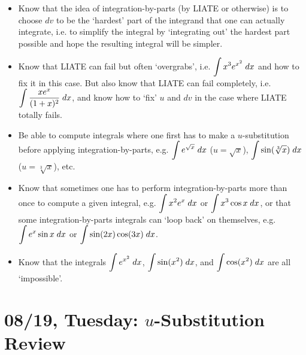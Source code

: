 \documentclass[11pt,letterpaper]{article}
\begin{document}
\begin{itemize}
\item Know that the idea of integration-by-parts (by LIATE or otherwise) is to choose $dv$ to be the `hardest' part of the integrand that one can actually integrate, i.e. to simplify the integral by `integrating out' the hardest part possible and hope the resulting integral will be simpler. 

\item Know that LIATE can fail but often `overgrabs', i.e. $\displaystyle\int x^3 e^{x^2} \;dx$ and how to fix it in this case. But also know that LIATE can fail completely, i.e. $\displaystyle\int \dfrac{x e^x}{(1 + x)^2} \;dx$, and know how to `fix' $u$ and $dv$ in the case where LIATE totally fails. 

\item Be able to compute integrals where one first has to make a $u$-substitution before applying integration-by-parts, e.g. $\displaystyle\int e^{\sqrt{x}} \;dx$ ($u= \sqrt{x}$), $\displaystyle\int \sin(\sqrt[3]{x}) \;dx$ ($u= \sqrt[3]{x}$), etc.

\item Know that sometimes one has to perform integration-by-parts more than once to compute a given integral, e.g. $\displaystyle\int x^2 e^x \;dx$ or $\displaystyle\int x^3 \cos x \;dx$, or that some integration-by-parts integrals can `loop back' on themselves, e.g. $\displaystyle\int e^x \sin x \;dx$ or $\displaystyle\int \sin(2x) \cos(3x) \;dx$. 

\item Know that the integrals $\displaystyle\int e^{x^2} \;dx$, $\displaystyle\int \sin(x^2) \;dx$, and $\displaystyle\int \cos(x^2) \;dx$ are all `impossible'. 
\end{itemize}

\newpage
\section*{08/19, Tuesday: $u$-Substitution Review\label{08-19}}
\end{document}

